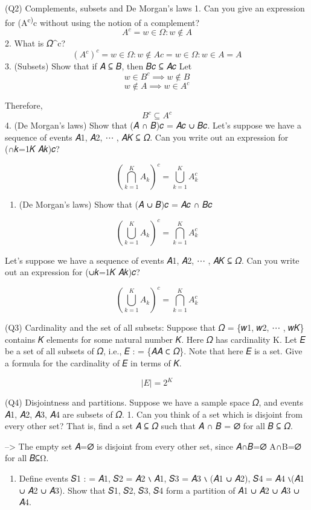 \documentclass[
]{article}
\providecommand{\tightlist}{%
  \setlength{\itemsep}{0pt}\setlength{\parskip}{0pt}}
\begin{document}
(Q2) Complements, subsets and De Morgan's laws 1. Can you give an
expression for (A\textsuperscript{c)}c without using the notion of a
complement? \[
A^c ={w \in Ω:w \notin A}
\] 2. What is 𝛺\^{}c? \[
(A^c)^c ={w \in Ω:w \notin A c}={w∈Ω:w∈A}=A
\] 3. (Subsets) Show that if 𝐴 ⊆ 𝐵, then 𝐵𝑐 ⊆ 𝐴𝑐 Let \[
w \in  B^c \implies w \notin B
\] \[
w \notin A \implies w \in A^c
\]

Therefore, \[
B^c \subseteq A^c
\] 4. (De Morgan's laws) Show that (𝐴 ∩ 𝐵)𝑐 = 𝐴𝑐 ∪ 𝐵𝑐. Let's suppose we
have a sequence of events 𝐴1, 𝐴2, ⋯ , 𝐴𝐾 ⊆ 𝛺. Can you write out an
expression for (∩𝑘=1𝐾 𝐴𝑘)𝑐?

\[
\left( \bigcap_{k=1}^{K} A_k \right)^c = \bigcup_{k=1}^{K} A_k^c 
\]

\begin{enumerate}
\def\labelenumi{\arabic{enumi}.}
\setcounter{enumi}{4}
\tightlist
\item
  (De Morgan's laws) Show that (𝐴 ∪ 𝐵)𝑐 = 𝐴𝑐 ∩ 𝐵𝑐
\end{enumerate}

\[
\left( \bigcup_{k=1}^{K} A_k \right)^c = \bigcap_{k=1}^{K} A_k^c 
\]

Let's suppose we have a sequence of events 𝐴1, 𝐴2, ⋯ , 𝐴𝐾 ⊆ 𝛺. Can you
write out an expression for (∪𝑘=1𝐾 𝐴𝑘)𝑐?

\[
\left( \bigcup_{k=1}^{K} A_k \right)^c = \bigcap_{k=1}^{K} A_k^c 
\]

(Q3) Cardinality and the set of all subsets: Suppose that 𝛺 = \{𝑤1, 𝑤2,
⋯ , 𝑤𝐾\} contains 𝐾 elements for some natural number 𝐾. Here 𝛺 has
cardinality K. Let 𝐸 be a set of all subsets of 𝛺, i.e., 𝐸 : =
\{𝐴\textbar 𝐴 ⊂ 𝛺\}. Note that here 𝐸 is a set. Give a formula for the
cardinality of 𝐸 in terms of 𝐾.

\[
|E| = 2^K
\]

(Q4) Disjointness and partitions. Suppose we have a sample space 𝛺, and
events 𝐴1, 𝐴2, 𝐴3, 𝐴4 are subsets of 𝛺. 1. Can you think of a set which
is disjoint from every other set? That is, find a set 𝐴 ⊆ 𝛺 such that 𝐴
∩ 𝐵 = ∅ for all 𝐵 ⊆ 𝛺.

--\textgreater{} The empty set 𝐴=∅ is disjoint from every other set,
since 𝐴∩𝐵=∅ A∩B=∅ for all 𝐵⊆Ω.

\begin{enumerate}
\def\labelenumi{\arabic{enumi}.}
\setcounter{enumi}{1}
\tightlist
\item
  Define events 𝑆1 : = 𝐴1, 𝑆2 = 𝐴2 ∖ 𝐴1, 𝑆3 = 𝐴3 ∖ (𝐴1 ∪ 𝐴2), 𝑆4 = 𝐴4
  ∖(𝐴1 ∪ 𝐴2 ∪ 𝐴3). Show that 𝑆1, 𝑆2, 𝑆3, 𝑆4 form a partition of 𝐴1 ∪ 𝐴2
  ∪ 𝐴3 ∪ 𝐴4.
\end{enumerate}
\end{document}
